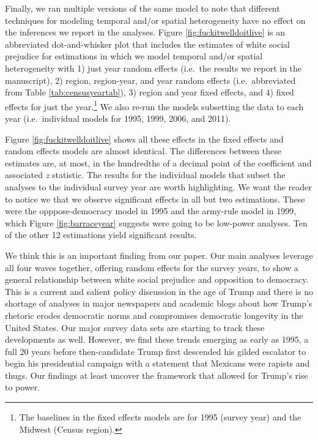 \documentclass[11pt,]{article}
\begin{document}
Finally, we ran multiple versions of the same model to note that
different techniques for modeling temporal and/or spatial heterogeneity
have no effect on the inferences we report in the analyses. Figure
\ref{fig:fuckitwelldoitlive} is an abbreviated dot-and-whisker plot that
includes the estimates of white social prejudice for estimations in
which we model temporal and/or spatial heterogeneity with 1) just year
random effects (i.e.~the results we report in the manuscript), 2)
region, region-year, and year random effects (i.e.~abbreviated from
Table \ref{tab:censusyeartab}), 3) region and year fixed effects, and 4)
fixed effects for just the year.\footnote{The baselines in the fixed
  effects models are for 1995 (survey year) and the Midwest (Census
  region).} We also re-run the models subsetting the data to each year
(i.e.~individual models for 1995, 1999, 2006, and 2011).

Figure \ref{fig:fuckitwelldoitlive} shows all these effects in the fixed
effects and random effects models are almost identical. The differences
between these estimates are, at most, in the hundredths of a decimal
point of the coefficient and associated \emph{z} statistic. The results
for the individual models that subset the analyses to the individual
survey year are worth highlighting. We want the reader to notice we that
we observe significant effects in all but two estimations. These were
the opppose-democracy model in 1995 and the army-rule model in 1999,
which Figure \ref{fig:barraceyear} suggests were going to be low-power
analyses. Ten of the other 12 estimations yield significant results.

We think this is an important finding from our paper. Our main analyses
leverage all four waves together, offering random effects for the survey
years, to show a general relationship between white social prejudice and
opposition to democracy. This is a current and salient policy discussion
in the age of Trump and there is no shortage of analyses in major
newspapers and academic blogs about how Trump's rhetoric erodes
democratic norms and compromises democratic longevity in the United
States. Our major survey data sets are starting to track these
developments as well. However, we find these trends emerging as early as
1995, a full 20 years before then-candidate Trump first descended his
gilded escalator to begin his presidential campaign with a statement
that Mexicans were rapists and thugs. Our findings at least uncover the
framework that allowed for Trump's rise to power.
\end{document}
